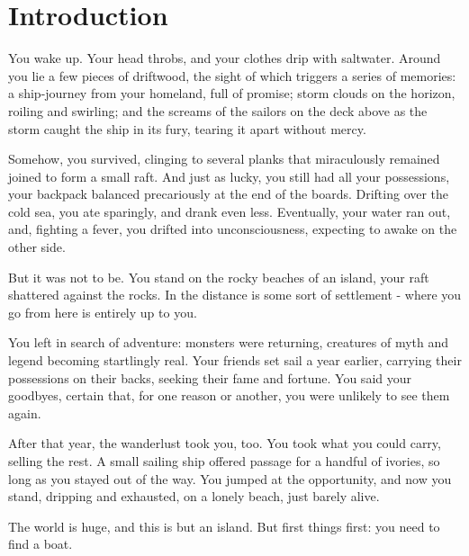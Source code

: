 \section{Introduction}

You wake up.  Your head throbs, and your clothes drip with saltwater. 
Around you lie a few pieces of driftwood, the sight of which triggers
a series of memories: a ship-journey from your homeland, full of promise;
storm clouds on the horizon, roiling and swirling; and the screams of the
sailors on the deck above as the storm caught the ship in its fury, tearing
it apart without mercy.

Somehow, you survived, clinging to several planks that miraculously
remained joined to form a small raft. And just as lucky, you still had all
your possessions, your backpack balanced precariously at the end of the
boards.  Drifting over the cold sea, you ate sparingly, and drank even
less.  Eventually, your water ran out, and, fighting a fever, you drifted
into unconsciousness, expecting to awake on the other side.

But it was not to be.  You stand on the rocky beaches of an island,
your raft shattered against the rocks.  In the distance is some sort of
settlement - where you go from here is entirely up to you.
 
You left in search of adventure: monsters were returning, creatures of myth
and legend becoming startlingly real.  Your friends set sail a year
earlier, carrying their possessions on their backs, seeking their fame and
fortune.  You said your goodbyes, certain that, for one reason or another,
you were unlikely to see them again.

After that year, the wanderlust took you, too.  You took what you could
carry, selling the rest.  A small sailing ship offered passage for a 
handful of ivories, so long as you stayed out of the way.  You
jumped at the opportunity, and now you stand, dripping and exhausted, on a
lonely beach, just barely alive.

The world is huge, and this is but an island.  But first things first:
you need to find a boat.

